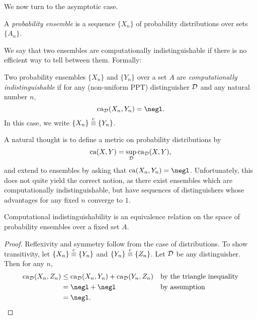 We now turn to the asymptotic case.

\begin{dfn}\label{def:probability ensemble}
  A \emph{probability ensemble} is a sequence $\{X_n\}$ of probability
  distributions over sets $\{A_n\}$.
\end{dfn}

We say that two ensembles are computationally indistinguishable if there is no
efficient way to tell between them. Formally:

\begin{dfn}\label{def:computational indistinguishability}
  Two probability ensembles $\{X_n\}$ and $\{Y_n\}$ over a set $A$ are
  \emph{computationally indistinguishable} if for any (non-uniform PPT)
  distinguisher $\mathcal{D}$ and any natural number $n$,
  \[
    \ca_\cD(X_n, Y_n) = \negl.
  \]
  In this case, we write $\{X_n\}\overset{\text{c}}{\equiv}\{Y_n\}$.
\end{dfn}

\begin{rmk}
  A natural thought is to define a metric on probability distributions by
  \[
    \operatorname{ca}(X, Y) = \sup_{\mathcal{D}}\operatorname{ca}_{\mathcal{D}}(X, Y),
  \] and extend to ensembles by asking
  that $\ca(X_n, Y_n) = \negl$. Unfortunately, this does not quite yield the
  correct notion, as there exist ensembles which are computationally
  indistinguishable, but have sequences of distinguishers whose advantages for
  any fixed $n$ converge to $1$.
\end{rmk}

\begin{prop}
  Computational indistinguishability is an equivalence relation on the space of
  probability ensembles over a fixed set $A$.
\end{prop}

\begin{proof}
  Reflexivity and symmetry follow from the case of distributions. To show
  transitivity, let $\{X_n\} \overset{\text{c}}{\equiv} \{Y_n\}$ and $\{Y_n\} \overset{\text{c}}{\equiv} \{Z_n\}$. Let
  $\mathcal{D}$ be any distinguisher. Then for any $n$, \begin{align*}
    \ca_\cD(X_n, Z_n) &\leq \ca_\cD(X_n, Y_n) + \ca_\cD(Y_n, Z_n) &&\text{by the triangle inequality} \\
                        &= \negl + \negl &&\text{by assumption} \\
                        &= \negl. &&\qedhere
  \end{align*}
\end{proof}

